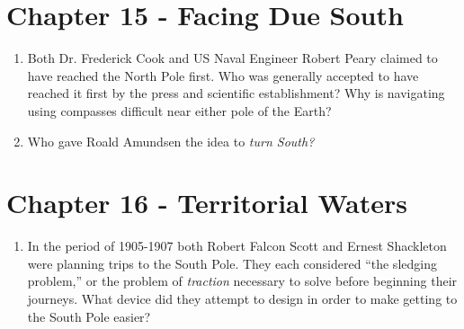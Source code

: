 \documentclass{article}
\begin{document}
\section{Chapter 15 - Facing Due South}
\begin{enumerate}
\item Both Dr. Frederick Cook and US Naval Engineer Robert Peary claimed to have reached the North Pole first.  Who was generally accepted to have reached it first by the press and scientific establishment?  Why is navigating using compasses difficult near either pole of the Earth? \\ \vspace{3cm}
\item Who gave Roald Amundsen the idea to \textit{turn South?}  \\ \vspace{2cm}
\end{enumerate}
\section{Chapter 16 - Territorial Waters}
\begin{enumerate}
\item In the period of 1905-1907 both Robert Falcon Scott and Ernest Shackleton were planning trips to the South Pole.  They each considered ``the sledging problem,'' or the problem of \textit{traction} necessary to solve before beginning their journeys.  What device did they attempt to design in order to make getting to the South Pole easier? \\ \vspace{3cm}
\end{enumerate}
\end{document}
